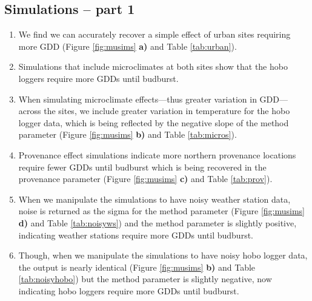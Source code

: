 \documentclass{article}\usepackage[]{graphicx}\usepackage[]{color}
\begin{document}
\subsection*{Simulations -- part 1}
\begin{enumerate}
  \item We find we can accurately recover a simple effect of urban sites requiring more GDD (Figure \ref{fig:musims} \textbf{a)} and Table \ref{tab:urban}). %
  \item Simulations that include microclimates at both sites show that the hobo loggers require more GDDs until budburst. 
  \item When simulating microclimate effects---thus greater variation in GDD---across the sites, we include greater variation in temperature for the hobo logger data, which is being reflected by the negative slope of the method parameter (Figure \ref{fig:musims} \textbf{b)} and Table \ref{tab:micros}). %
  \item Provenance effect simulations indicate more northern provenance locations require fewer GDDs until budburst which is being recovered in the provenance parameter (Figure \ref{fig:musims} \textbf{c)} and Table \ref{tab:prov}). %
  \item When we manipulate the simulations to have noisy weather station data, noise is returned as the sigma for the method parameter (Figure \ref{fig:musims} \textbf{d)} and Table \ref{tab:noisyws}) and the method parameter is slightly positive, indicating weather stations require more GDDs until budburst. %
  \item Though, when we manipulate the simulations to have noisy hobo logger data, the output is nearly identical (Figure \ref{fig:musims} \textbf{b)} and Table \ref{tab:noisyhobo}) but the method parameter is slightly negative, now indicating hobo loggers require more GDDs until budburst. %
  \end{enumerate}
  
\end{document}
